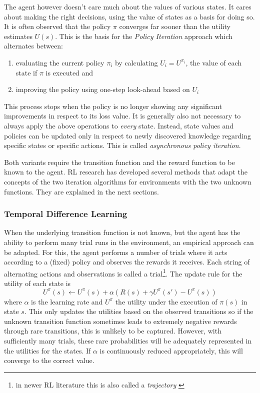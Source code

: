 The agent however doesn't care much about the values of various states. It cares about making the right
decisions, using the value of states as a basis for doing so. It is often observed that the policy $\pi$ converges far
sooner than the utility estimates $U(s)$. This is the basis for the \emph{Policy Iteration} approach which alternates
between:
\begin{enumerate}
    \item evaluating the current policy $\pi_i$ by calculating $U_i=U^{\pi_i}$, the value of each state if $\pi$ is
        executed and
    \item improving the policy using one-step look-ahead based on $U_i$
\end{enumerate}

This process stops when the policy is no longer showing any significant improvements in respect to its loss value. It is
generally also not necessary to always apply the above operations to \emph{every} state. Instead, state values and
policies can be updated only in respect to newly discovered knowledge regarding specific states or specific actions.
This is called \emph{asynchronous policy iteration}.

Both variants require the transition function and the reward function to be known to the agent. \ac{RL} research has
developed several methods that adapt the concepts of the two iteration algorithms for environments with the two unknown
functions. They are explained in the next sections.

\subsubsection{Temporal Difference Learning}%
\label{sub:temporal_difference_learning}

When the underlying transition function is not known, but the agent has the ability to perform many trial runs in the
environment, an empirical approach can be adapted. For this, the agent performs a number of trials where it acts
according to a (fixed) policy and observes the rewards it receives. Each string of alternating actions and observations
is called a trial\footnote{in newer \ac{RL} literature this is also called a \emph{trajectory} \citep{proximalpolicyopt, heess2017emergence} }.
The update rule for the utility of each state is
\begin{equation}
    U^\pi(s) \gets U^\pi(s) + \alpha(R(s) + \gamma U^\pi(s') - U^\pi(s))
\end{equation}
where $\alpha$ is the learning rate and $U^\pi$ the utility under the execution of $\pi(s)$ in state $s$. This only
updates the utilities based on the observed transitions so if the unknown transition function sometimes leads to
extremely negative rewards through rare transitions, this is unlikely to be captured. However, with sufficiently many
trials, these rare probabilities will be adequately represented in the utilities for the states. If $\alpha$ is
continuously reduced appropriately, this will converge to the correct value.

